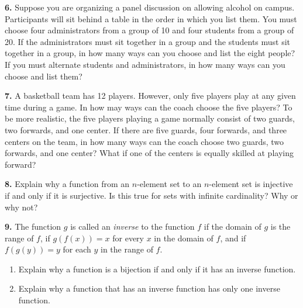 \documentclass[12pt, letterpaper]{article}
\theoremstyle{definition}
\begin{document}
\vspace*{0.3in}\noindent
\textbf{6.} Suppose you are organizing a panel discussion on allowing alcohol
on campus. Participants will sit behind a table in the order in which
you list them. You must choose four administrators from a group
of 10 and four students from a group of 20. If the administrators
must sit together in a group and the students must sit together in a
group, in how many ways can you choose and list the eight people?
If you must alternate students and administrators, in how many
ways can you choose and list them?

\vspace*{0.3in}\noindent
\textbf{7.} A basketball team has 12 players. However, only five players play
at any given time during a game. In how may ways can the coach
choose the five players? To be more realistic, the five players playing
a game normally consist of two guards, two forwards, and one center.
If there are five guards, four forwards, and three centers on the team,
in how many ways can the coach choose two guards, two forwards,
and one center? What if one of the centers is equally skilled
at playing forward?

\clearpage\pagebreak\noindent
\textbf{8.} Explain why a function from an $n$-element set to an $n$-element
set is injective if and only if it is surjective. Is this true for sets
with infinite cardinality? Why or why not?

\vspace*{0.3in}\noindent
\textbf{9.} The function $g$ is called an \emph{inverse} to the function $f$
if the domain of $g$ is the range of $f$, if $g(f(x)) = x$ for every $x$ in
the domain of $f$, and if $f(g(y)) = y$ for each $y$ in the range of $f$.
\begin{enumerate}[label=\textbf{\alph*.}]
    \item Explain why a function is a bijection if and only if it has an
          inverse function.
    \item Explain why a function that has an inverse function has only
          one inverse function.
\end{enumerate}
\end{document}
